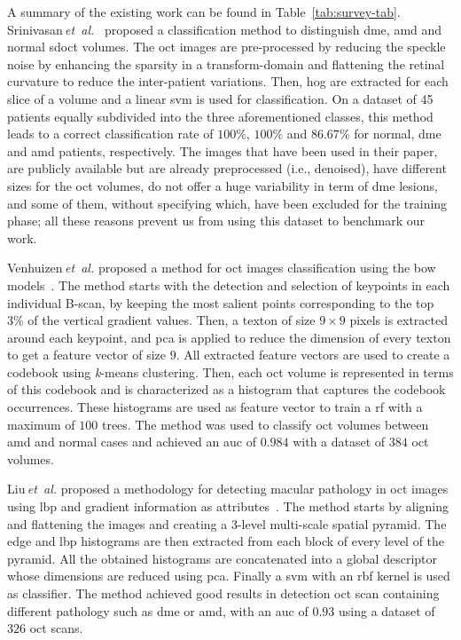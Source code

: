 A summary of the existing work can be found in Table~\ref{tab:survey-tab}.
Srinivasan\,\textit{et~al.}~\cite{Srinivasan2014} proposed a classification method to distinguish \gls{dme}, \gls{amd} and normal \gls{sdoct} volumes.
The \gls{oct} images are pre-processed by reducing the speckle noise by enhancing the sparsity in a transform-domain and flattening the retinal curvature to reduce the inter-patient variations.
Then, \gls{hog} are extracted for each slice of a volume and a linear \gls{svm} is used for classification.
On a dataset of 45 patients equally subdivided into the three aforementioned classes, this method leads to a correct classification rate of $100 \%$, $100 \%$ and $86.67 \%$ for normal, \gls{dme} and \gls{amd} patients, respectively.
The images that have been used in their paper, are publicly available but are already preprocessed (i.e., denoised), have different sizes for the \gls{oct} volumes, do not offer a huge variability in term of \gls{dme} lesions, and some of them, without specifying which, have been excluded for the training phase; all these reasons prevent us from using this dataset to benchmark our work. 

Venhuizen\,\textit{et~al.} proposed a method for \gls{oct} images classification using the \gls{bow} models~\cite{Venhuizen2015}.
The method starts with the detection and selection of keypoints in each individual B-scan, by keeping the most salient points corresponding to the top $3 \%$ of the vertical gradient values. Then, a texton of size $9 \times 9$ pixels is extracted around each keypoint, and \gls{pca} is applied to reduce the dimension of every texton to get a feature vector of size $9$.
All extracted feature vectors are used to create a codebook using \textit{k}-means clustering.
Then, each \gls{oct} volume is represented in terms of this codebook and is characterized as a histogram that captures the codebook occurrences.
These histograms are used as feature vector to train a \gls{rf} with a maximum of $100$ trees.
The method was used to classify \gls{oct} volumes between \gls{amd} and normal cases and achieved an \gls{auc} of $0.984$ with a dataset of $384$ \gls{oct} volumes.

Liu\,\textit{et~al.} proposed a methodology for detecting macular pathology in \gls{oct} images using \gls{lbp} and gradient information as attributes~\cite{Liu2011}.
The method starts by aligning and flattening the images and creating a $3$-level multi-scale spatial pyramid.
The edge and \gls{lbp} histograms are then extracted from each block of every level of the pyramid.
All the obtained histograms are concatenated into a global descriptor whose dimensions are reduced using \gls{pca}.
Finally a \gls{svm} with an \gls{rbf} kernel is used as classifier.
The method achieved good results in detection \gls{oct} scan containing different pathology such as \gls{dme} or \gls{amd}, with an \gls{auc} of $0.93$ using a dataset of $326$ \gls{oct} scans.

